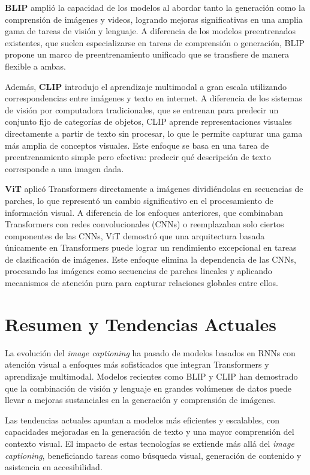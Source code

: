 \textbf{BLIP} \cite{li2022blip} amplió la capacidad de los modelos al abordar tanto la generación como la comprensión de imágenes y videos, logrando mejoras significativas en una amplia gama de tareas de visión y lenguaje. A diferencia de los modelos preentrenados existentes, que suelen especializarse en tareas de comprensión o generación, BLIP propone un marco de preentrenamiento unificado que se transfiere de manera flexible a ambas. 

Además, \textbf{CLIP} \cite{radford2021learning} introdujo el aprendizaje multimodal a gran escala utilizando correspondencias entre imágenes y texto en internet. A diferencia de los sistemas de visión por computadora tradicionales, que se entrenan para predecir un conjunto fijo de categorías de objetos, CLIP aprende representaciones visuales directamente a partir de texto sin procesar, lo que le permite capturar una gama más amplia de conceptos visuales. Este enfoque se basa en una tarea de preentrenamiento simple pero efectiva: predecir qué descripción de texto corresponde a una imagen dada.

\textbf{ViT} \cite{dosovitskiy2021image} aplicó Transformers directamente a imágenes dividiéndolas en secuencias de parches, lo que representó un cambio significativo en el procesamiento de información visual. A diferencia de los enfoques anteriores, que combinaban Transformers con redes convolucionales (CNNs) o reemplazaban solo ciertos componentes de las CNNs, ViT demostró que una arquitectura basada únicamente en Transformers puede lograr un rendimiento excepcional en tareas de clasificación de imágenes. Este enfoque elimina la dependencia de las CNNs, procesando las imágenes como secuencias de parches lineales y aplicando mecanismos de atención pura para capturar relaciones globales entre ellos.

\section{Resumen y Tendencias Actuales}

La evolución del \textit{image captioning} ha pasado de modelos basados en RNNs con atención visual a enfoques más sofisticados que integran Transformers y aprendizaje multimodal. Modelos recientes como BLIP y CLIP han demostrado que la combinación de visión y lenguaje en grandes volúmenes de datos puede llevar a mejoras sustanciales en la generación y comprensión de imágenes. 

Las tendencias actuales apuntan a modelos más eficientes y escalables, con capacidades mejoradas en la generación de texto y una mayor comprensión del contexto visual. El impacto de estas tecnologías se extiende más allá del \textit{image captioning}, beneficiando tareas como búsqueda visual, generación de contenido y asistencia en accesibilidad.

